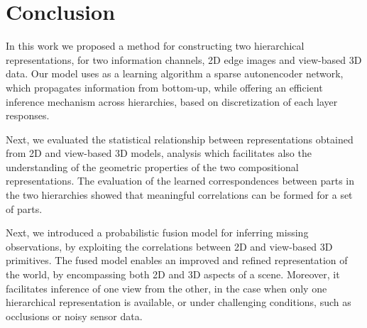 \documentclass[runningheads]{llncs}
\begin{document}
\section{Conclusion}
 
In this work we proposed a method for constructing two hierarchical representations, for two information channels, 2D edge images and view-based 3D data. Our model uses as a learning algorithm a sparse autonencoder network, which propagates information from bottom-up, while offering an efficient inference mechanism across hierarchies, based on discretization of each layer responses. 

Next, we evaluated the statistical relationship between representations obtained from 2D and view-based 3D models, analysis which facilitates also the understanding of the geometric properties of the two compositional representations. The evaluation of the learned correspondences between parts in the two hierarchies showed that meaningful correlations can be formed for a set of parts. 

Next, we introduced a probabilistic fusion model for inferring missing observations, by exploiting the correlations between 2D and view-based 3D primitives. The fused model enables an improved and refined representation of the world, by encompassing both 2D and 3D aspects of a scene. Moreover, it facilitates inference of one view from the other, in the case when only one hierarchical representation is available, or under challenging conditions, such as occlusions or noisy sensor data. 



\end{document}
